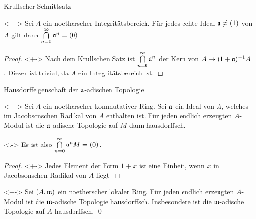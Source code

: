 \begin{frame}{Krullscher Schnittsatz}
	\begin{corollary}<+->
		\label{cor:krull}
		Sei \(A\) ein noetherscher Integritätsbereich. Für jedes echte Ideal \(\mathfrak{a} \neq (1)\) von \(A\) gilt
		dann \(\bigcap\limits_{n = 0}^\infty \mathfrak{a}^n = (0)\).
	\end{corollary}
	\begin{proof}<+->
		Nach dem Krullschen Satz ist \(\bigcap\limits_{n = 0}^\infty \mathfrak{a}^n\) der Kern von \(A \to (1 + \mathfrak{a})^{-1} A\).
		Dieser ist trivial, da \(A\) ein Integritätsbereich ist.
	\end{proof}
\end{frame}

\begin{frame}{Hausdorffeigenschaft der \(\mathfrak{a}\)-adischen Topologie}
	\begin{corollary}<+->
		Sei \(A\) ein noetherscher kommutativer Ring. Sei \(\mathfrak{a}\) ein Ideal von \(A\), welches im Jacobsonschen
		Radikal von \(A\) enthalten ist. Für jeden endlich erzeugten \(A\)-Modul ist die \(\mathfrak{a}\)-adische Topologie auf
		\(M\) dann hausdorffsch.
	\end{corollary}
	\begin{visibleenv}<.->
		Es ist also \(\bigcap\limits_{n = 0}^\infty \mathfrak{a}^n M = (0)\).
	\end{visibleenv}
	\begin{proof}<+->
		Jedes Element der Form \(1 + x\) ist eine Einheit, wenn \(x\) in Jacobsonschen Radikal von \(A\) liegt.
	\end{proof}
	\begin{corollary}<+->
		Sei \((A, \mathfrak{m})\) ein noetherscher lokaler Ring. Für jeden endlich erzeugten \(A\)-Modul ist die
		\(\mathfrak{m}\)-adische Topologie hausdorffsch. Insbesondere ist die \(\mathfrak{m}\)-adische Topologie auf \(A\)
		hausdorffsch.
		\qed
	\end{corollary}
\end{frame}

